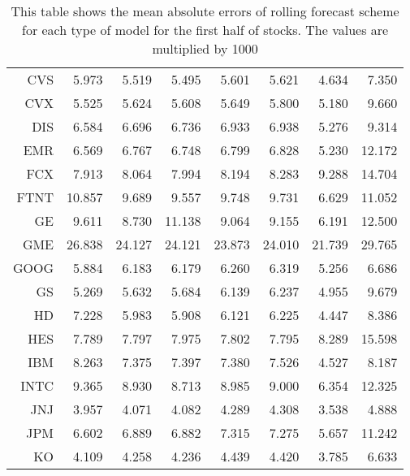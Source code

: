\begin{table}[ht]
\begin{tabular}{rrrrrrrr}
  CVS & 5.973 & 5.519 & 5.495 & 5.601 & 5.621 & 4.634 & 7.350 \\ 
  CVX & 5.525 & 5.624 & 5.608 & 5.649 & 5.800 & 5.180 & 9.660 \\ 
  DIS & 6.584 & 6.696 & 6.736 & 6.933 & 6.938 & 5.276 & 9.314 \\ 
  EMR & 6.569 & 6.767 & 6.748 & 6.799 & 6.828 & 5.230 & 12.172 \\ 
  FCX & 7.913 & 8.064 & 7.994 & 8.194 & 8.283 & 9.288 & 14.704 \\ 
  FTNT & 10.857 & 9.689 & 9.557 & 9.748 & 9.731 & 6.629 & 11.052 \\ 
  GE & 9.611 & 8.730 & 11.138 & 9.064 & 9.155 & 6.191 & 12.500 \\ 
  GME & 26.838 & 24.127 & 24.121 & 23.873 & 24.010 & 21.739 & 29.765 \\ 
  GOOG & 5.884 & 6.183 & 6.179 & 6.260 & 6.319 & 5.256 & 6.686 \\ 
  GS & 5.269 & 5.632 & 5.684 & 6.139 & 6.237 & 4.955 & 9.679 \\ 
  HD & 7.228 & 5.983 & 5.908 & 6.121 & 6.225 & 4.447 & 8.386 \\ 
  HES & 7.789 & 7.797 & 7.975 & 7.802 & 7.795 & 8.289 & 15.598 \\ 
  IBM & 8.263 & 7.375 & 7.397 & 7.380 & 7.526 & 4.527 & 8.187 \\ 
  INTC & 9.365 & 8.930 & 8.713 & 8.985 & 9.000 & 6.354 & 12.325 \\ 
  JNJ & 3.957 & 4.071 & 4.082 & 4.289 & 4.308 & 3.538 & 4.888 \\ 
  JPM & 6.602 & 6.889 & 6.882 & 7.315 & 7.275 & 5.657 & 11.242 \\ 
  KO & 4.109 & 4.258 & 4.236 & 4.439 & 4.420 & 3.785 & 6.633 \\ 
   \hline
\end{tabular}
\caption[MAE rolling forecast (1)]{This table shows the mean absolute errors of rolling forecast scheme for each type of model for the first half of stocks. 
                     The values are multiplied by 1000} 
\label{Table:MAE_r_1}
\end{table}
